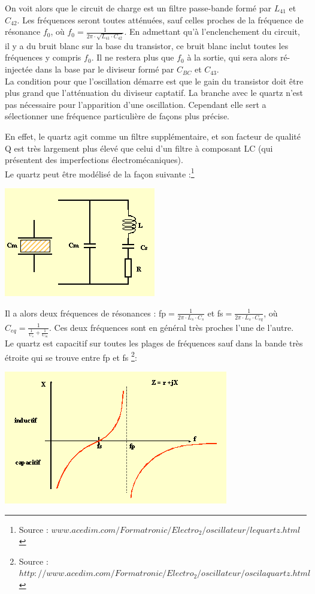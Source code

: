 \documentclass{article}
\begin{document}
On voit alors que le circuit de charge est un filtre passe-bande formé par $L_{41}$ et $C_{42}$. Les fréquences seront toutes atténuées, sauf celles proches de la fréquence de résonance $f_0$, où $f_0 = \frac{1}{2 \pi \cdot \sqrt{L_{41} \cdot C_{42}}}$.
En admettant qu'à l'enclenchement du circuit, il y a du bruit blanc sur la base du transistor, ce bruit blanc inclut toutes les fréquences y compris $f_0$. Il ne restera plus que $f_0$ à la sortie, qui sera alors ré-injectée dans la base par le diviseur formé par $C_{BC}$ et $C_{43}$.\\
La condition pour que l'oscillation démarre est que le gain du transistor doit être plus grand que l'atténuation du diviseur captatif. La branche avec le quartz n'est pas nécessaire pour l'apparition d'une oscillation. Cependant elle sert a sélectionner une fréquence particulière de façons plus précise.

En effet, le quartz agit comme un filtre supplémentaire, et son facteur de qualité Q est très largement plus élevé que celui d'un filtre à composant LC (qui présentent des imperfections électromécaniques).\\

Le quartz peut être modélisé de la façon suivante :\footnote{Source : $www.acedim.com/Formatronic/Electro_2/oscillateur/lequartz.html$}
\begin{center}
\includegraphics[width=0.4\linewidth]{modele_quartz.png}
\end{center}
Il a alors deux fréquences de résonances : fp$=\frac{1}{2\pi \cdot L_s \cdot C_s}$ et fs$=\frac{1}{2\pi \cdot L_s \cdot C_{eq}}$, où $C_{eq} = \frac{1}{\frac{1}{C_s} + \frac{1}{C_m}}$. Ces deux fréquences sont en général très proches l'une de l'autre.\\
Le quartz est capacitif sur toutes les plages de fréquences sauf dans la bande très étroite qui se trouve entre fp et fs \footnote{Source : $http://www.acedim.com/Formatronic/Electro_2/oscillateur/oscilaquartz.html$}:
\begin{center}
\includegraphics[width=0.4\linewidth]{impedence_quartz.png}
\end{center}
\end{document}
